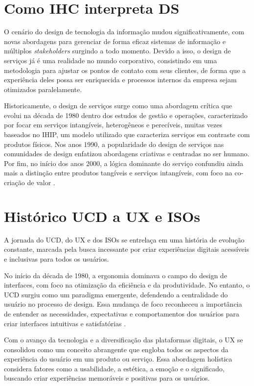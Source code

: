 \documentclass[
  12pt,
  openright,
  twoside,
  a4paper,
  english,
  french,
  spanish,
  brazil
]{abntex2}
\begin{document}
\chapter{Como IHC interpreta DS}

O cenário do design de tecnologia da informação mudou significativamente, com
novas abordagens para gerenciar de forma eficaz sistemas de informação e
múltiplos \textit{stakeholders} surgindo a todo momento. Devido a isso, o design
de serviços já é uma realidade no mundo corporativo, consistindo em uma
metodologia para ajustar os pontos de contato com seus clientes, de forma que a
experiência deles possa ser enriquecida e processos internos da empresa sejam
otimizados paralelamente.

Historicamente, o design de serviços surge como uma abordagem crítica que evolui
na década de 1980 dentro dos estudos de gestão e operações, caracterizado por
focar em serviços intangíveis, heterogêneos e perecíveis, muitas vezes baseados
no IHIP, um modelo utilizado que caracteriza serviços em contraste com produtos
físicos. Nos anos 1990, a popularidade do design de serviços nas comunidades de
design enfatizou abordagens criativas e centradas no ser humano. Por fim, no
início dos anos 2000, a lógica dominante do serviço confundiu ainda mais a
distinção entre produtos tangíveis e serviços intangíveis, com foco na
co-criação de valor \cite{DAP:Guia-de-Boas-Praticas}.

\chapter{Histórico UCD a UX e ISOs}

A jornada do UCD, do UX e dos ISOs se entrelaça em uma história de evolução
constante, marcada pela busca incessante por criar experiências digitais
acessíveis e inclusivas para todos os usuários.

No início da década de 1980, a ergonomia dominava o campo do design de
interfaces, com foco na otimização da eficiência e da produtividade. No entanto,
o UCD surgiu como um paradigma emergente, defendendo a centralidade do usuário
no processo de design. Essa mudança de foco reconheceu a importância de entender
as necessidades, expectativas e comportamentos dos usuários para criar
interfaces intuitivas e satisfatórias
\cite{Adriana:A-Closer-Look-on-the-User-Centred-Design}.

Com o avanço da tecnologia e a diversificação das plataformas digitais, o UX se
consolidou como um conceito abrangente que engloba todos os aspectos da
experiência do usuário em um produto ou serviço. Essa abordagem holística
considera fatores como a usabilidade, a estética, a emoção e o significado,
buscando criar experiências memoráveis e positivas para os usuários.
\end{document}
